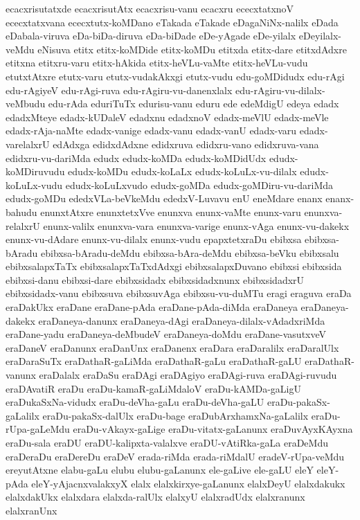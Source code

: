 {ecacxrisutatxde
ecacxrisutAtx
ecacxrisu-vanu
ecacxru
ececxtatxnoV
ececxtatxvana
ececxtutx-koMDano
eTakada
eTakade
eDagaNiNx-nalilx
eDada
eDabala-viruva
eDa-biDa-diruva
eDa-biDade
eDe-yAgade
eDe-yilalx
eDeyilalx-veMdu
eNisuva
etitx
etitx-koMDide
etitx-koMDu
etitxda
etitx-dare
etitxdAdxre
etitxna
etitxru-varu
etitx-hAkida
etitx-heVLu-vaMte
etitx-heVLu-vudu
etutxtAtxre
etutx-varu
etutx-vudakAkxgi
etutx-vudu
edu-goMDidudx
edu-rAgi
edu-rAgiyeV
edu-rAgi-ruva
edu-rAgiru-vu-danenxlalx
edu-rAgiru-vu-dilalx-veMbudu
edu-rAda
eduriTuTx
edurisu-vanu
eduru
ede
edeMdigU
edeya
edadx
edadxMteye
edadx-kUDaleV
edadxnu
edadxnoV
edadx-meVlU
edadx-meVle
edadx-rAja-naMte
edadx-vanige
edadx-vanu
edadx-vanU
edadx-varu
edadx-varelalxrU
edAdxga
edidxdAdxne
edidxruva
edidxru-vano
edidxruva-vana
edidxru-vu-dariMda
edudx
edudx-koMDa
edudx-koMDidUdx
edudx-koMDiruvudu
edudx-koMDu
edudx-koLaLx
edudx-koLuLx-vu-dilalx
edudx-koLuLx-vudu
edudx-koLuLxvudo
edudx-goMDa
edudx-goMDiru-vu-dariMda
edudx-goMDu
ededxVLa-beVkeMdu
ededxV-Luvavu
enU
eneMdare
enanx
enanx-bahudu
enunxtAtxre
enunxtetxVve
enunxva
enunx-vaMte
enunx-varu
enunxva-relalxrU
enunx-valilx
enunxva-vara
enunxva-varige
enunx-vAga
enunx-vu-dakekx
enunx-vu-dAdare
enunx-vu-dilalx
enunx-vudu
epapxtetxraDu
ebibxsa
ebibxsa-bAradu
ebibxsa-bAradu-deMdu
ebibxsa-bAra-deMdu
ebibxsa-beVku
ebibxsalu
ebibxsalapxTaTx
ebibxsalapxTaTxdAdxgi
ebibxsalapxDuvano
ebibxsi
ebibxsida
ebibxsi-danu
ebibxsi-dare
ebibxsidadx
ebibxsidadxnunx
ebibxsidadxrU
ebibxsidadx-vanu
ebibxsuva
ebibxsuvAga
ebibxsu-vu-duMTu
eragi
eraguva
eraDa
eraDakUkx
eraDane
eraDane-pAda
eraDane-pAda-diMda
eraDaneya
eraDaneya-dakekx
eraDaneya-danunx
eraDaneya-dAgi
eraDaneya-dilalx-vAdadxriMda
eraDane-yadu
eraDaneya-deMbudeV
eraDaneya-doMdu
eraDane-vasutxveV
eraDaneV
eraDanunx
eraDanUnx
eraDanenx
eraDara
eraDaralilx
eraDaralUlx
eraDaraSuTx
eraDathaR-gaLiMda
eraDathaR-gaLu
eraDathaR-gaLU
eraDathaR-vanunx
eraDalalx
eraDaSu
eraDAgi
eraDAgiyo
eraDAgi-ruva
eraDAgi-ruvudu
eraDAvatiR
eraDu
eraDu-kamaR-gaLiMdaloV
eraDu-kAMDa-gaLigU
eraDukaSxNa-vidudx
eraDu-deVha-gaLu
eraDu-deVha-gaLU
eraDu-pakaSx-gaLalilx
eraDu-pakaSx-dalUlx
eraDu-bage
eraDubArxhamxNa-gaLalilx
eraDu-rUpa-gaLeMdu
eraDu-vAkayx-gaLige
eraDu-vitatx-gaLanunx
eraDuvAyxKAyxna
eraDu-sala
eraDU
eraDU-kalipxta-valalxve
eraDU-vAtiRka-gaLa
eraDeMdu
eraDeraDu
eraDereDu
eraDeV
erada-riMda
erada-riMdalU
eradeV-rUpa-veMdu
ereyutAtxne
elabu-gaLu
elubu
elubu-gaLanunx
ele-gaLive
ele-gaLU
eleY
eleY-pAda
eleY-yAjacnxvalakxyX
elalx
elalxkirxye-gaLanunx
elalxDeyU
elalxdakukx
elalxdakUkx
elalxdara
elalxda-ralUlx
elalxyU
elalxradUdx
elalxranunx
elalxranUnx
}
